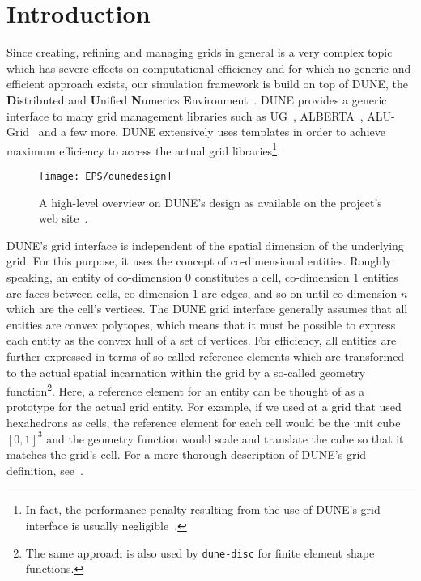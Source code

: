 \chapter{Introduction}

Since creating, refining and managing grids in general is a very
complex topic which has severe effects on computational efficiency and
for which no generic and efficient approach exists, our simulation
framework is build on top of DUNE, the \textbf{D}istributed and \textbf{U}nified
\textbf{N}umerics \textbf{E}nvironment~\cite{DUNE-HP}. DUNE provides a generic interface to many
grid management libraries such as UG~\cite{UG-HP}, ALBERTA~\cite{ALBERTA-HP},
ALU-Grid~\cite{ALUGRID-HP} and a few more. DUNE extensively uses templates in
order to achieve maximum efficiency to access the actual grid
libraries\footnote{In fact, the performance penalty resulting from the
  use of DUNE's grid interface is usually negligible~\cite{BURRI2006}.}.
\begin{figure}[hbt]
  \centering 
  \texttt{[image: EPS/dunedesign]}
  \caption{
    \label{fig:dune-design}
    A high-level overview on DUNE's design as available on the project's
    web site~\cite{DUNE-HP}.
  }
\end{figure}

DUNE's grid interface is independent of the spatial dimension of the
underlying grid. For this purpose, it uses the concept of
co-dimensional entities. Roughly speaking, an entity of co-dimension
$0$ constitutes a cell, co-dimension $1$ entities are faces between
cells, co-dimension $1$ are edges, and so on until co-dimension $n$
which are the cell's vertices.  The DUNE grid interface generally
assumes that all entities are convex polytopes, which means that it
must be possible to express each entity as the convex hull of a set of
vertices. For efficiency, all entities are further expressed in terms
of so-called reference elements which are transformed to the actual
spatial incarnation within the grid by a so-called geometry
function\footnote{The same approach is also used by \texttt{dune-disc} for
  finite element shape functions.}. Here, a reference element for an
entity can be thought of as a prototype for the actual grid
entity. For example, if we used at a grid that used hexahedrons as cells,
the reference element for each cell would be the unit cube $[0, 1]^3$
and the geometry function would scale and translate the cube so that
it matches the grid's cell. For a more thorough description of DUNE's
grid definition, see~\cite{BASTIAN2008}.

